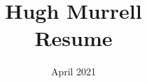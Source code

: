 \documentclass[12pt]{article}
\title{
           Hugh Murrell \\
           Resume \\
       }
\date{April 2021}
\begin{document}
\maketitle


%

\small
\end{document}
